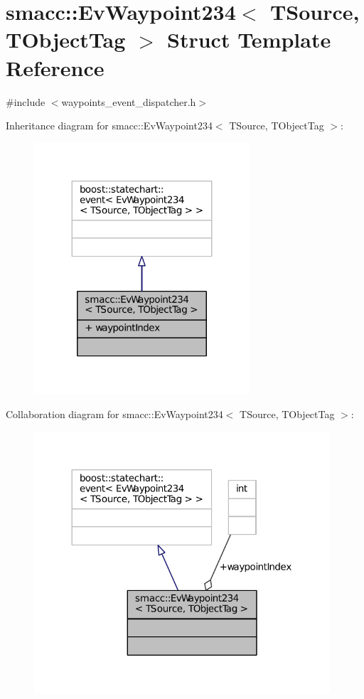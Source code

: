 \hypertarget{structsmacc_1_1EvWaypoint234}{}\section{smacc\+:\+:Ev\+Waypoint234$<$ T\+Source, T\+Object\+Tag $>$ Struct Template Reference}
\label{structsmacc_1_1EvWaypoint234}


{\ttfamily \#include $<$waypoints\+\_\+event\+\_\+dispatcher.\+h$>$}



Inheritance diagram for smacc\+:\+:Ev\+Waypoint234$<$ T\+Source, T\+Object\+Tag $>$\+:
\nopagebreak
\begin{figure}[H]
\begin{center}
\leavevmode
\includegraphics[width=227pt]{structsmacc_1_1EvWaypoint234__inherit__graph}
\end{center}
\end{figure}


Collaboration diagram for smacc\+:\+:Ev\+Waypoint234$<$ T\+Source, T\+Object\+Tag $>$\+:
\nopagebreak
\begin{figure}[H]
\begin{center}
\leavevmode
\includegraphics[width=312pt]{structsmacc_1_1EvWaypoint234__coll__graph}
\end{center}
\end{figure}

